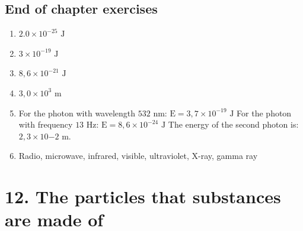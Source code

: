 \subsection{End of chapter exercises} 
\begin{multicols}{2}
\begin{enumerate}[itemsep=20pt, label=\textbf{\arabic*}.]
\item $2.0 \times 10^{-25} \text{ J}$
\item $3 \times 10^{-19} \text{ J}$
\item $8,6 \times 10^{-21} \text{ J}$
\item $3,0 \times 10^{3} \text{ m}$
\item For the photon with wavelength $532 \text{ nm}$: $\text{E}=3,7 \times 10^{-19} \text{ J}$ \newline
For the photon with frequency $13 \text{ Hz}$: $\text{E}=8,6 \times 10^{-24} \text{ J}$ \newline
The energy of the second photon is: $2,3 \times 10{-2} \text{ m}$.
\item Radio, microwave, infrared, visible, ultraviolet, X-ray, gamma ray
\end{enumerate}
\end{multicols}

\section {12. The particles that substances are made of}
